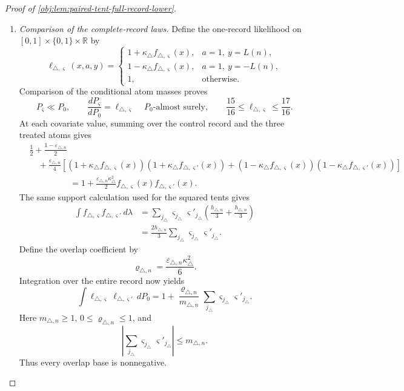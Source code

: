\documentclass[11pt]{article}
\begin{document}
\begin{proof}[Proof of \cref{obj:lem:paired-tent-full-record-lower}]
\begin{enumerate}
\item \emph{Comparison of the complete-record laws.}
Define the one-record likelihood on
\([0,1]\times\{0,1\}\times\mathbb R\) by
\[
\ell_{\triangle,\varsigma}(x,a,y)=
\begin{cases}
1+\kappa_\triangle f_{\triangle,\varsigma}(x),
&a=1,\ y=L(n),\\
1-\kappa_\triangle f_{\triangle,\varsigma}(x),
&a=1,\ y=-L(n),\\
1,&\text{otherwise}.
\end{cases}
\]
Comparison of the conditional atom masses proves
\[
P_\varsigma\ll P_0,
\qquad
\frac{dP_\varsigma}{dP_0}=\ell_{\triangle,\varsigma}
\quad P_0\text{-almost surely},
\qquad
\frac{15}{16}\le\ell_{\triangle,\varsigma}\le\frac{17}{16}.
\]
At each covariate value, summing over the control record and the three
treated atoms gives
\[
\begin{aligned}
&\frac12+\frac{1-\varepsilon_{\triangle,n}}2\\
&\quad+\frac{\varepsilon_{\triangle,n}}4
\left[
(1+\kappa_\triangle f_{\triangle,\varsigma}(x))
(1+\kappa_\triangle f_{\triangle,\varsigma'}(x))
+
(1-\kappa_\triangle f_{\triangle,\varsigma}(x))
(1-\kappa_\triangle f_{\triangle,\varsigma'}(x))
\right]\\
&\hspace{2cm}
=1+\frac{\varepsilon_{\triangle,n}\kappa_\triangle^2}{2}
f_{\triangle,\varsigma}(x)f_{\triangle,\varsigma'}(x).
\end{aligned}
\]
The same support calculation used for the squared tents gives
\[
\begin{aligned}
\int f_{\triangle,\varsigma}f_{\triangle,\varsigma'}\,d\lambda
&=
\sum_{j_\triangle}
\varsigma_{j_\triangle}\varsigma'_{j_\triangle}
\left(\frac{h_{\triangle,n}}3+\frac{h_{\triangle,n}}3\right)\\
&=\frac{2h_{\triangle,n}}3
\sum_{j_\triangle}\varsigma_{j_\triangle}\varsigma'_{j_\triangle}.
\end{aligned}
\]
Define the overlap coefficient by
\[
\varrho_{\triangle,n}
=\frac{\varepsilon_{\triangle,n}\kappa_\triangle^2}{6}.
\]
Integration over the entire record now yields
\[
\int\ell_{\triangle,\varsigma}\ell_{\triangle,\varsigma'}\,dP_0
=
1+\frac{\varrho_{\triangle,n}}{m_{\triangle,n}}
\sum_{j_\triangle}\varsigma_{j_\triangle}\varsigma'_{j_\triangle}.
\]
Here \(m_{\triangle,n}\ge1\), \(0\le\varrho_{\triangle,n}\le1\), and
\[
\left|
\sum_{j_\triangle}\varsigma_{j_\triangle}\varsigma'_{j_\triangle}
\right|\le m_{\triangle,n}.
\]
Thus every overlap base is nonnegative.


\end{enumerate}
\end{proof}
\end{document}
